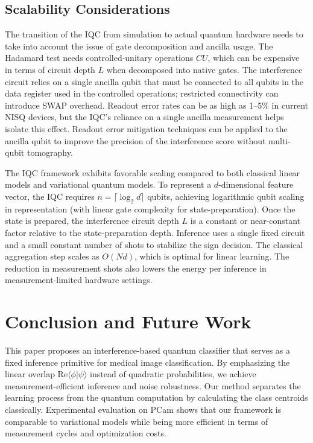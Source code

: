 \documentclass[conference]{IEEEtran}
\begin{document}
\subsection{Scalability Considerations}
The transition of the IQC from simulation to actual quantum hardware needs to take into account the issue of gate decomposition and ancilla usage. The Hadamard test needs controlled-unitary operations $CU$, which can be expensive in terms of circuit depth $L$ when decomposed into native gates. The interference circuit relies on a single ancilla qubit that must be connected to all qubits in the data register used in the controlled operations; restricted connectivity can introduce SWAP overhead. Readout error rates can be as high as 1--5\% in current NISQ devices, but the IQC's reliance on a single ancilla measurement helps isolate this effect. Readout error mitigation techniques can be applied to the ancilla qubit to improve the precision of the interference score without multi-qubit tomography.

The IQC framework exhibits favorable scaling compared to both classical linear models and variational quantum models. To represent a $d$-dimensional feature vector, the IQC requires $n = \lceil \log_2 d \rceil$ qubits, achieving logarithmic qubit scaling in representation (with linear gate complexity for state-preparation). Once the state is prepared, the interference circuit depth $L$ is a constant or near-constant factor relative to the state-preparation depth. Inference uses a single fixed circuit and a small constant number of shots to stabilize the sign decision. The classical aggregation step scales as $O(Nd)$, which is optimal for linear learning. The reduction in measurement shots also lowers the energy per inference in measurement-limited hardware settings.

\section{Conclusion and Future Work}
This paper proposes an interference-based quantum classifier that serves as a fixed inference primitive for medical image classification. By emphasizing the linear overlap $\mathrm{Re}\langle \phi | \psi \rangle$ instead of quadratic probabilities, we achieve measurement-efficient inference and noise robustness. Our method separates the learning process from the quantum computation by calculating the class centroids classically. Experimental evaluation on PCam shows that our framework is comparable to variational models while being more efficient in terms of measurement cycles and optimization costs.
\end{document}
